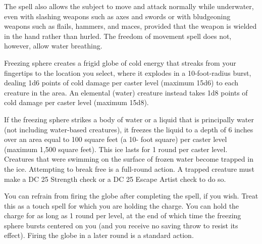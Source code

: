 \begin{multicols}{2}
\begin{small}
\smallskip\noindent The spell also allows the subject to move and attack normally while underwater, even with slashing weapons such as axes and swords or with bludgeoning weapons such as flails, hammers, and maces, provided that the weapon is wielded in the hand rather than hurled. The freedom of movement spell does not, however, allow water breathing.


\noindent Freezing sphere creates a frigid globe of cold energy that streaks from your fingertips to the location you select, where it explodes in a 10-foot-radius burst, dealing 1d6 points of cold damage per caster level (maximum 15d6) to each creature in the area. An elemental (water) creature instead takes 1d8 points of cold damage per caster level (maximum 15d8).

\smallskip\noindent If the freezing sphere strikes a body of water or a liquid that is principally water (not including water-based creatures), it freezes the liquid to a depth of 6 inches over an area equal to 100 square feet (a 10- foot square) per caster level (maximum 1,500 square feet). This ice lasts for 1 round per caster level. Creatures that were swimming on the surface of frozen water become trapped in the ice. Attempting to break free is a full-round action. A trapped creature must make a DC 25 Strength check or a DC 25 Escape Artist check to do so.

\smallskip\noindent You can refrain from firing the globe after completing the spell, if you wish. Treat this as a touch spell for which you are holding the charge. You can hold the charge for as long as 1 round per level, at the end of which time the freezing sphere bursts centered on you (and you receive no saving throw to resist its effect). Firing the globe in a later round is a standard action.



\end{small}
\end{multicols}
